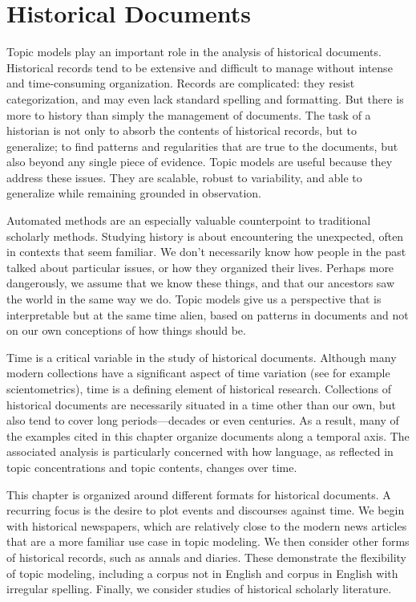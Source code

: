 
\chapter{Historical Documents}
\label{ch:nonfiction}

Topic models play an important role in the analysis of historical documents.
Historical records tend to be extensive and difficult to manage without intense and time-consuming organization.
Records are complicated: they resist categorization, and may even lack standard spelling and formatting.
But there is more to history than simply the management of documents.
The task of a historian is not only to absorb the contents of historical records, but to generalize; to find patterns and regularities that are true to the documents, but also beyond any single piece of evidence.
Topic models are useful because they address these issues. They are scalable, robust to variability, and able to generalize while remaining grounded in observation.

Automated methods are an especially valuable counterpoint to traditional scholarly methods.
Studying history is about encountering the unexpected, often in contexts that seem familiar.
We don't necessarily know how people in the past talked about particular issues, or how they organized their lives.
Perhaps more dangerously, we assume that we know these things, and that our ancestors saw the world in the same way we do.
Topic models give us a perspective that is interpretable but at the same time alien, based on patterns in documents and not on our own conceptions of how things should be.

Time is a critical variable in the study of historical documents.
Although many modern collections have a significant aspect of time variation (see for example scientometrics), time is a defining element of historical research.
Collections of historical documents are necessarily situated in a time other than our own, but also tend to cover long periods---decades or even centuries.
As a result, many of the examples cited in this chapter organize documents along a temporal axis.
The associated analysis is particularly concerned with how language, as reflected in topic concentrations and topic contents, changes over time.

This chapter is organized around different formats for historical documents.
A recurring focus is the desire to plot events and discourses against time.
We begin with historical newspapers, which are relatively close to the modern news articles that are a more familiar use case in topic modeling.
We then consider other forms of historical records, such as annals and diaries.
These demonstrate the flexibility of topic modeling, including a corpus not in English and corpus in English with irregular spelling.
Finally, we consider studies of historical scholarly literature.


